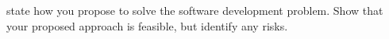 state how you propose to solve the software development problem. Show that your proposed approach is feasible, but identify any risks.
